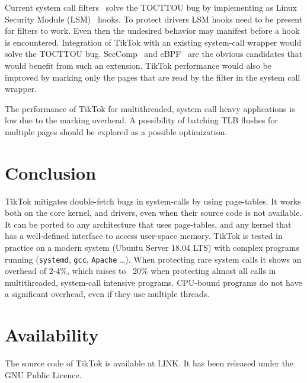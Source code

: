\documentclass[conference]{IEEEtran}
\newcommand{\sysname}{TikTok}
\begin{document}
Current system call filters~\cite{landlock,krsi} solve the TOCTTOU bug by
implementing as Linux Security Module (LSM)~\cite{morris2002linux} hooks. To
protect drivers LSM hooks need to be present for filters to work. Even then the
undesired behavior may manifest before a hook is encountered. Integration of
\sysname{} with an existing system-call wrapper would solve the TOCTTOU bug.
SecComp~\cite{seccomp} and eBPF~\cite{ebpf} are the obvious candidates that
would benefit from such an extension. \sysname{} performance would also be
improved by marking only the pages that are read by the filter in the system
call wrapper.

The performance of \sysname{} for multithreaded, system call heavy applications
is low due to the marking overhead. A possibility of batching TLB
flushes for multiple pages should be explored as a possible optimization.

\section{Conclusion}
\sysname{} mitigates double-fetch bugs in system-calls by using page-tables. It
works both on the core kernel, and drivers, even when their source code is not
available. It can be ported to any architecture that uses page-tables, and any
kernel that has a well-defined interface to access user-space memory. \sysname{}
is tested in practice on a modern system (Ubuntu Server 18.04 LTS) with complex
programs running (\texttt{systemd}, \texttt{gcc}, \texttt{Apache} \ldots). When
protecting rare system calls it shows an overhead of 2-4\%, which raises to
~20\% when protecting almost all calls in multithreaded, system-call intensive
programs. CPU-bound programs do not have a significant overhead, even if they
use multiple threads.

\section*{Availability}

The source code of TikTok is available at LINK. It has been released under the
GNU Public Licence.




\end{document}
